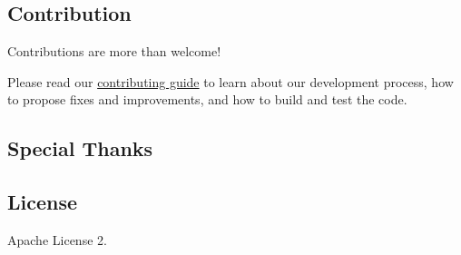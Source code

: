 \subsection*{Contribution}

Contributions are more than welcome!

Please read our \hyperlink{_c_o_n_t_r_i_b_u_t_i_n_g_8md}{contributing guide} to learn about our development process, how to propose fixes and improvements, and how to build and test the code.

\subsection*{Special Thanks}

\href{https://www.loftorbital.com/}{\tt }

\subsection*{License}

Apache License 2. 